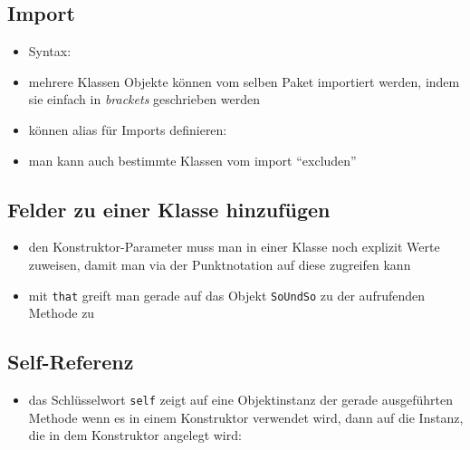 \subsection{Import}
\begin{itemize}
  \item Syntax:
  
  
  
  \item mehrere Klassen \oder Objekte können vom selben Paket importiert
  werden, indem sie einfach in \textit{brackets} geschrieben werden
  
  
  
  \item können alias für Imports definieren:
  
  
  
  \item man kann auch bestimmte Klassen vom import \enquote{excluden}
  
  
  
\end{itemize}


\subsection{Felder zu einer Klasse hinzufügen}
\begin{itemize}
  \item den Konstruktor-Parameter muss man in einer Klasse noch explizit
  Werte zuweisen, damit man via der Punktnotation auf diese zugreifen kann
  
  
  
  \item mit \texttt{that} greift man gerade auf das Objekt \texttt{SoUndSo}
  zu
  der aufrufenden Methode zu
\end{itemize}


\subsection{Self-Referenz}
\begin{itemize}
  \item das Schlüsselwort \texttt{self} zeigt auf eine
  Objektinstanz der gerade ausgeführten Methode \oder wenn es
  in einem Konstruktor verwendet wird, dann auf die Instanz,
  die in dem Konstruktor angelegt wird:
  
  
\end{itemize}


